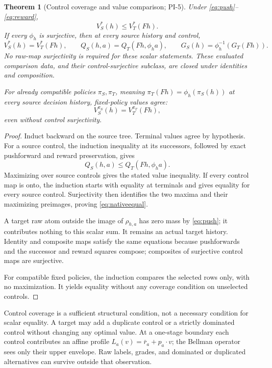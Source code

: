 \documentclass[11pt]{article}
\newtheorem{theorem}{Theorem}[section]
\theoremstyle{definition}
\begin{document}
\begin{theorem}[Control coverage and value comparison; PI-5]
\label{thm:native}
Under \eqref{eq:push}--\eqref{eq:reward},
\[
 V^*_S(h)\leq V^*_T(Fh).
\]
If every \(\phi_h\) is surjective, then at every source history and control,
\begin{equation}
 V^*_S(h)=V^*_T(Fh),\qquad
 Q_S(h,a)=Q_T(Fh,\phi_h a),\qquad
 G_S(h)=\phi_h^{-1}(G_T(Fh)).
 \label{eq:nativeequal}
\end{equation}
No raw-map surjectivity is required for these scalar statements. These
evaluated comparison data, and their control-surjective subclass, are
closed under identities and composition.

For already compatible policies \(\pi_S,\pi_T\), meaning
\(\pi_T(Fh)=\phi_h(\pi_S(h))\) at every source decision history,
fixed-policy values agree:
\[
 V^{\pi_S}_S(h)=V^{\pi_T}_T(Fh),
\]
even without control surjectivity.
\end{theorem}
\begin{proof}
Induct backward on the source tree. Terminal values agree by hypothesis.
For a source control, the induction inequality at its successors, followed
by exact pushforward and reward preservation, gives
\[
 Q_S(h,a)\leq Q_T(Fh,\phi_h a).
\]
Maximizing over source controls gives the stated value inequality.
If every control map is onto, the induction starts with equality at
terminals and gives equality for every source control. Surjectivity then
identifies the two maxima and their maximizing preimages, proving
\eqref{eq:nativeequal}.

A target raw atom outside the image of \(\rho_{h,a}\) has zero mass by
\eqref{eq:push}; it contributes nothing to this scalar sum. It remains an
actual target history. Identity and composite maps satisfy the same
equations because pushforwards and the successor and reward squares
compose; composites of surjective control maps are surjective.

For compatible fixed policies, the induction compares the selected rows
only, with no maximization. It yields equality without any coverage
condition on unselected controls.
\end{proof}

Control coverage is a sufficient structural condition, not a necessary
condition for scalar equality. A target may add a duplicate control or a
strictly dominated control without changing any optimal value. At a
one-stage boundary each control contributes an affine profile
\(L_a(v)=\bar r_a+p_a\cdot v\); the Bellman operator sees only their upper
envelope. Raw labels, grades, and dominated or duplicated alternatives
can survive outside that observation.
\end{document}
